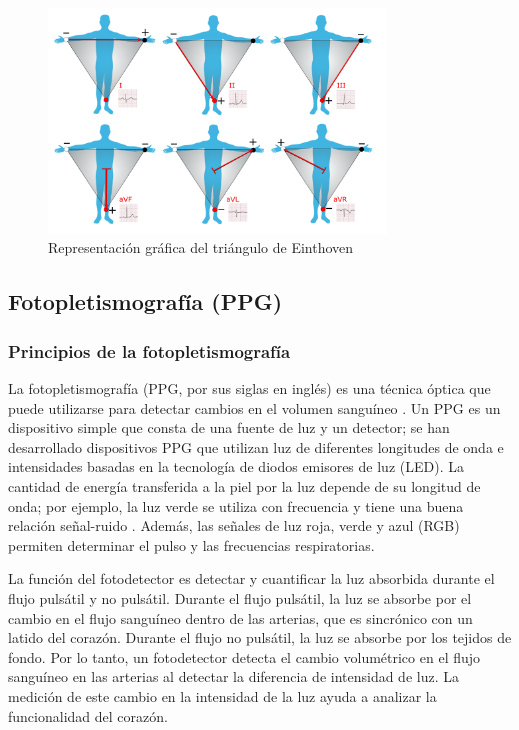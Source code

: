         \begin{figure}[H]
            \centering
            \includegraphics[width=0.8\textwidth]{img/Marco/triangulo.png}
            \caption[Representación gráfica del triángulo de Einthoven]{Representación gráfica del triángulo de Einthoven\footnotemark}
            \label{fig:triangulo_Einthoven}
        \end{figure}

    \subsection{Fotopletismografía (PPG)}
        \subsubsection{Principios de la fotopletismografía}
            La fotopletismografía (PPG, por sus siglas en inglés) es una técnica óptica que puede utilizarse para detectar cambios en el volumen sanguíneo \cite{Hertzman_1938}. Un PPG es un dispositivo simple que consta de una fuente de luz y un detector; se han desarrollado dispositivos PPG que utilizan luz de diferentes longitudes de onda e intensidades basadas en la tecnología de diodos emisores de luz (LED). La cantidad de energía transferida a la piel por la luz depende de su longitud de onda; por ejemplo, la luz verde se utiliza con frecuencia y tiene una buena relación señal-ruido \cite{Challoner_1979}. Además, las señales de luz roja, verde y azul (RGB) permiten determinar el pulso y las frecuencias respiratorias.

            La función del fotodetector es detectar y cuantificar la luz absorbida durante el flujo pulsátil y no pulsátil. Durante el flujo pulsátil, la luz se absorbe por el cambio en el flujo sanguíneo dentro de las arterias, que es sincrónico con un latido del corazón. Durante el flujo no pulsátil, la luz se absorbe por los tejidos de fondo. Por lo tanto, un fotodetector detecta el cambio volumétrico en el flujo sanguíneo en las arterias al detectar la diferencia de intensidad de luz. La medición de este cambio en la intensidad de la luz ayuda a analizar la funcionalidad del corazón.

